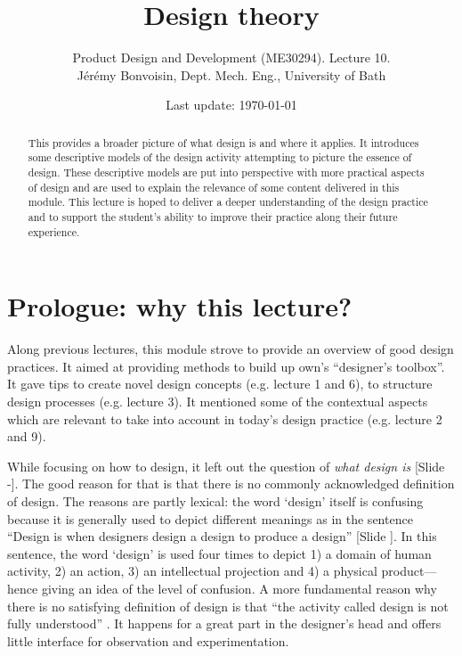 \documentclass{article}
\newcounter{slide}
\begin{document}
\title{Design theory}

\author{Product Design and Development (ME30294). Lecture 10. \\ Jérémy Bonvoisin, Dept. Mech. Eng., University of Bath}
\date{Last update: \today}

\maketitle

\begin{abstract}
This provides a broader picture of what design is and where it applies. It introduces some descriptive models of the design activity attempting to picture the essence of design. These descriptive models are put into perspective with more practical aspects of design and are used to explain the relevance of some content delivered in this module. This lecture is hoped to deliver a deeper understanding of the design practice and to support the student's ability to improve their practice along their future experience.
\end{abstract}

\tableofcontents

\section{Prologue: why this lecture?}
\label{sec:prologue}
Along previous lectures, this module strove to provide an overview of good design practices. It aimed at providing methods to build up own's ``designer's toolbox''. It gave tips to create novel design concepts (e.g. lecture 1 and 6), to structure design processes (e.g. lecture 3). It mentioned some of the contextual aspects which are relevant to take into account in today's design practice (e.g. lecture 2 and 9). 

While focusing on how to design, it left out the question of \emph{what design is} {\color{blue}[Slide -]}. The good reason for that is that there is no commonly acknowledged definition of design. The reasons are partly lexical: the word `design' itself is confusing because it is generally used to depict different meanings as in the sentence ``Design is when designers design a design to produce a design'' {\color{blue}[Slide ]}\cite{heskett2001past}. In this sentence, the word `design' is used four times to depict 1) a domain of human activity, 2) an action, 3) an intellectual projection and 4) a physical product---hence giving an idea of the level of confusion. A more fundamental reason why there is no satisfying definition of design is that ``the activity called design is not fully understood'' \cite{hybsEvolutionaryProcessModel1992}. It happens for a great part in the designer's head and offers little interface for observation and experimentation.
\end{document}
